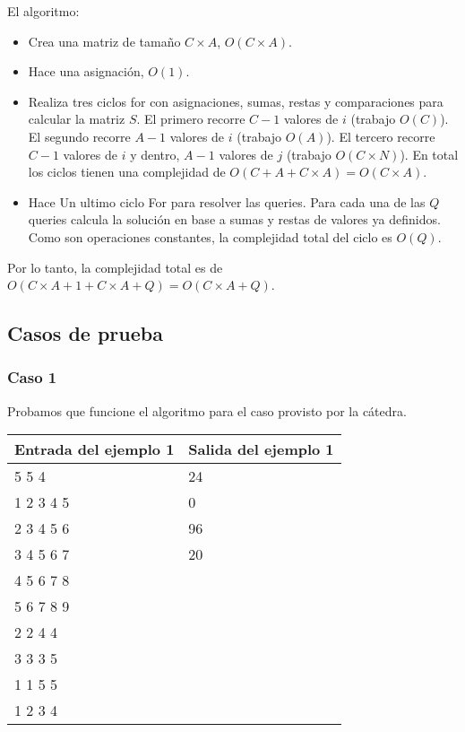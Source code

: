 El algoritmo:
\begin{itemize}
	\item Crea una matriz de tamaño $C \times A$, $O(C \times A)$.
	\item Hace una asignación, $O(1)$.
	\item Realiza tres ciclos for con asignaciones, sumas, restas y comparaciones para calcular la matriz $S$. El primero 
	recorre $C-1$ valores de $i$ (trabajo $O(C)$). El segundo recorre $A-1$ valores de $i$ (trabajo $O(A)$). El 
	tercero recorre $C-1$ valores de $i$ y dentro, $A-1$ valores de $j$ (trabajo $O(C \times N)$). En total los
	ciclos tienen una complejidad de $O(C + A + C \times A) = O(C \times A)$.
	\item Hace Un ultimo ciclo For para resolver las queries. Para cada una de las $Q$ queries calcula la solución en
	base a sumas y restas de valores ya definidos. Como son operaciones constantes, la complejidad total del ciclo es $O(Q)$.
\end{itemize}

Por lo tanto, la complejidad total es de $O(C \times A + 1 + C \times A + Q) = O(C \times A + Q)$.

\subsection{Casos de prueba}

\subsubsection*{Caso 1}

Probamos que funcione el algoritmo para el caso provisto por la cátedra.

\begin{center}
    \begin{tabular}{| l | l |}
    \hline
    Entrada del ejemplo 1 & Salida del ejemplo 1  \\ \hline
    5 5 4 & 24 \\
	1 2 3 4 5 & 0 \\
	2 3 4 5 6 & 96 \\
	3 4 5 6 7 & 20 \\
	4 5 6 7 8 & \\
	5 6 7 8 9 & \\
	2 2 4 4  & \\
	3 3 3 5  & \\
	1 1 5 5  & \\
	1 2 3 4  & \\
	\hline
    \end{tabular}
\end{center}

